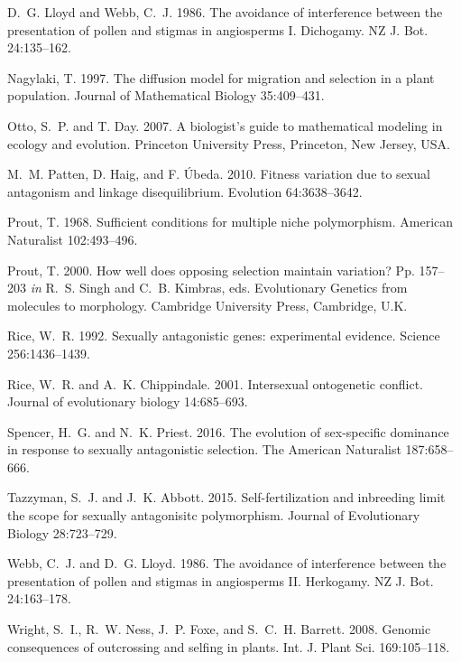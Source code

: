 \documentclass{article}
\begin{document}
\begin{thebibliography}{}
D.~G. Lloyd and Webb, C.~J. 1986.
\newblock The avoidance of interference between the presentation of pollen and stigmas in angiosperms I. Dichogamy.
\newblock NZ J. Bot. 24:135--162.

Nagylaki, T. 1997.
\newblock The diffusion model for migration and selection in a plant population.
\newblock Journal of Mathematical Biology 35:409--431.

Otto, S.~P. and T. Day. 2007.
\newblock A biologist's guide to mathematical modeling in ecology and evolution.
\newblock Princeton University Press, Princeton, New Jersey, USA.

M.~M. Patten, D. Haig, and F. \'{U}beda. 2010.
\newblock Fitness variation due to sexual antagonism and linkage disequilibrium.
\newblock Evolution 64:3638--3642.

Prout, T. 1968.
\newblock Sufficient conditions for multiple niche polymorphism.
\newblock American Naturalist 102:493--496.

Prout, T. 2000.
\newblock How well does opposing selection maintain variation?
\newblock Pp. 157--203 \textit{in} R.~S. Singh and C.~B. Kimbras, eds. Evolutionary Genetics from molecules to morphology. Cambridge University Press, Cambridge, U.K.

Rice, W.~R. 1992.
\newblock Sexually antagonistic genes: experimental evidence.
\newblock Science 256:1436--1439.

Rice, W.~R. and A.~K. Chippindale. 2001.
\newblock Intersexual ontogenetic conflict.
\newblock Journal of evolutionary biology 14:685--693.

Spencer, H.~G. and N.~K. Priest. 2016.
\newblock The evolution of sex-specific dominance in response to sexually antagonistic selection.
\newblock The American Naturalist 187:658--666.

Tazzyman, S.~J. and J.~K. Abbott. 2015.
\newblock Self-fertilization and inbreeding limit the scope for sexually antagonisitc polymorphism.
\newblock Journal of Evolutionary Biology 28:723--729.

Webb, C.~J. and D.~G. Lloyd. 1986.
\newblock The avoidance of interference between the presentation of pollen and stigmas in angiosperms II. Herkogamy.
\newblock NZ J. Bot. 24:163--178.

Wright, S.~I., R.~W. Ness, J.~P. Foxe, and S.~C.~H. Barrett. 2008.
\newblock Genomic consequences of outcrossing and selfing in plants.
\newblock Int. J. Plant Sci. 169:105--118.



\end{thebibliography}
\end{document}
